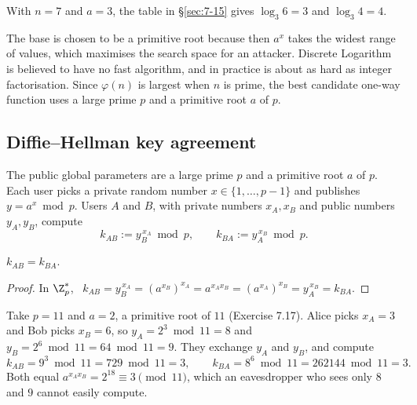 \begin{example}
With $n=7$ and $a=3$, the table in \S\ref{sec:7-15} gives $\log_3 6=3$ and $\log_3 4=4$.
\end{example}

\begin{note}
The base is chosen to be a primitive root because then $a^x$ takes the widest range of values, which maximises the search space for an attacker. Discrete Logarithm is believed to have no fast algorithm, and in practice is about as hard as integer factorisation. Since $\varphi(n)$ is largest when $n$ is prime, the best candidate one-way function uses a large prime $p$ and a primitive root $a$ of $p$.
\end{note}

\subsection{Diffie--Hellman key agreement}
\label{sec:7-18}

\begin{definition}
The public global parameters are a large prime $p$ and a primitive root $a$ of $p$. Each user picks a private random number $x\in\{1,\dots,p-1\}$ and publishes $y=a^x\bmod p$. Users $A$ and $B$, with private numbers $x_A,x_B$ and public numbers $y_A,y_B$, compute
\[
k_{AB} := y_B^{\,x_A}\bmod p, \qquad k_{BA} := y_A^{\,x_B}\bmod p.
\]
\end{definition}

\begin{proposition}[Agreement]
\label{thm:dhagree}
$k_{AB}=k_{BA}$.
\end{proposition}
\begin{proof}
In $\Z_p^*$, \ $k_{AB}=y_B^{\,x_A}=(a^{x_B})^{x_A}=a^{x_Ax_B}=(a^{x_A})^{x_B}=y_A^{\,x_B}=k_{BA}$.
\end{proof}

\begin{example}
Take $p=11$ and $a=2$, a primitive root of $11$ (Exercise 7.17). Alice picks $x_A=3$ and Bob picks $x_B=6$, so $y_A=2^3\bmod11=8$ and $y_B=2^6\bmod11=64\bmod11=9$. They exchange $y_A$ and $y_B$, and compute
\[
k_{AB}=9^3\bmod11=729\bmod11=3, \qquad k_{BA}=8^6\bmod11=262144\bmod11=3.
\]
Both equal $a^{x_Ax_B}=2^{18}\equiv3\pmod{11}$, which an eavesdropper who sees only $8$ and $9$ cannot easily compute.
\end{example}

